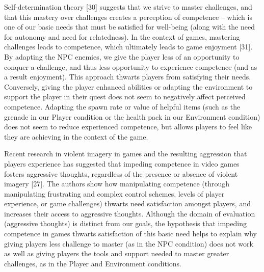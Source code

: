 Self-determination theory [30] suggests that we strive to master challenges, and that this mastery over challenges creates a perception of competence – which is one of our basic needs that must be satisfied for well-being (along with the need for autonomy and need for relatedness).  In the context of games, mastering challenges leads to competence, which ultimately leads to game enjoyment [31]. By adapting the NPC enemies, we give the player less of an opportunity to conquer a challenge, and thus less opportunity to experience competence (and as a result enjoyment). This approach thwarts players from satisfying their needs. Conversely, giving the player enhanced abilities or adapting the environment to support the player in their quest does not seem to negatively affect perceived competence. Adapting the spawn rate or value of helpful items (such as the grenade in our Player condition or the health pack in our Environment condition) does not seem to reduce experienced competence, but allows players to feel like they are achieving in the context of the game.

Recent research in violent imagery in games and the resulting aggression that players experience has suggested that impeding competence in video games fosters aggressive thoughts, regardless of the presence or absence of violent imagery [27]. The authors show how manipulating competence (through manipulating frustrating and complex control schemes, levels of player experience, or game challenges) thwarts need satisfaction amongst players, and increases their access to aggressive thoughts. Although the domain of evaluation (aggressive thoughts) is distinct from our goals, the hypothesis that impeding competence in games thwarts satisfaction of this basic need helps to explain why giving players less challenge to master (as in the NPC condition) does not work as well as giving players the tools and support needed to master greater challenges, as in the Player and Environment conditions.

